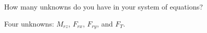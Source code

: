 How many unknowns do you have in your system of equations?

\begin{solution}
    Four unknowns: $M_{rz}$, $F_{rx}$, $F_{ry}$, and $F_T$.
\end{solution}